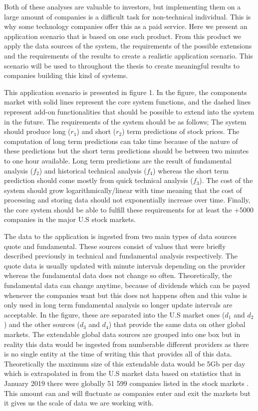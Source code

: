 \documentclass[article,11pt]{article}
\begin{document}
Both of these analyses are valuable to investors, but implementing them on a large amount of companies is a difficult task for non-technical individual.
This is why some technology companies offer this as a paid service.
Here we present an application scenario that is based on one such product.
From this product we apply the data sources of the system, the requirements of the possible extensions and the requirements of the results to create a realistic application scenario.
This scenario will be used to throughout the thesis to create meaningful results to companies building this kind of systems.

This application scenario is presented in figure 1.
In the figure, the components market with solid lines represent the core system functions, and the dashed lines represent add-on functionalities that should be possible to extend into the system in the future.
The requirements of the system should be as follows;
The system should produce long ($r_1$) and short ($r_2$) term predictions of stock prices.
The computation of long term predictions can take time because of the nature of these predictions but the short term predictions should be between two minutes to one hour available.
Long term predictions are the result of fundamental analysis ($f_2$) and historical technical analysis ($f_4$) whereas the short term prediction should come mostly from quick technical analysis ($f_3$).
The cost of the system should grow logarithmically/linear with time meaning that the cost of processing and storing data should not exponentially increase over time.
Finally, the core system should be able to fulfill these requirements for at least the +5000 companies in the major U.S stock markets.

The data to the application is ingested from two main types of data sources quote and fundamental.
These sources consist of values that were briefly described previously in technical and fundamental analysis respectively.
The quote data is usually updated with minute intervals depending on the provider whereas the fundamental data does not change so often.
Theoretically, the fundamental data can change anytime, because of dividends which can be payed whenever the companies want but this does not happens often and this value is only used in long term fundamental analysis so longer update intervals are acceptable.
In the figure, these are separated into the U.S market ones ($d_1$ and $d_2$) and the other sources ($d_3$ and $d_4$) that provide the same data on other global markets.
The extendable global data sources are grouped into one box but in reality this data would be ingested from numberable different providers as there is no single entity at the time of writing this that provides all of this data.
Theoretically the maximum size of this extendable data would be 5Gb per day which is extrapolated in from the U.S market data based on statistics that in January 2019 there were globally 51 599 companies listed in the stock markets \cite{global}.
This amount can and will fluctuate as companies enter and exit the markets but it gives us the scale of data we are working with.
\end{document}
